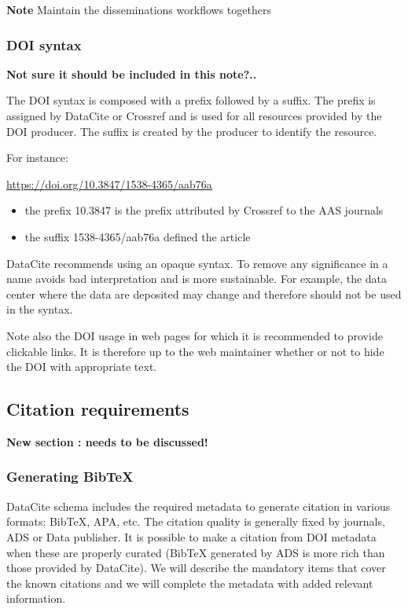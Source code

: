 \documentclass[11pt,a4paper]{ivoa}
\newcommand{\important}[1]{
	\begin{bigdescription}
		\item \color{ivoacolor}\textbf{Note} #1
	\end{bigdescription}
}
\begin{document}
\important{
Maintain the disseminations workflows togethers
}


\subsubsection{DOI syntax}
\textbf{\color{red} Not sure it should be included in this note?..}

The DOI syntax is composed with a prefix followed by a suffix.
The prefix is assigned by DataCite or Crossref and is used for all resources provided by the DOI producer. The suffix is created by the producer to identify the resource.

For instance: 

\url{https://doi.org/10.3847/1538-4365/aab76a}

\begin{itemize}
	\item the prefix 10.3847 is the prefix attributed by Crossref to the AAS journals 
	\item the suffix 1538-4365/aab76a defined the article 
\end{itemize}

DataCite recommends using an opaque syntax. To remove any significance
in a name avoids bad interpretation and is more sustainable. For example,
the data center where the data are deposited may change and therefore
should not be used in the syntax.

Note also the DOI usage in web pages for which it is recommended to provide clickable links. It is therefore up to the web maintainer whether or not to hide the DOI with appropriate text.

\subsection{Citation requirements}
\label{sec:citation}
\textbf{\color{red} New section : needs to be discussed!}


\subsubsection{Generating BibTeX}
DataCite schema includes the required metadata to generate citation in various formats: BibTeX, APA, etc. The citation quality is generally fixed by journals, ADS or Data publisher. It is possible to make a citation from DOI metadata when these are properly curated (BibTeX generated by ADS is more rich than those provided by DataCite). 
We will describe the mandatory items that cover the known citations and we will complete the metadata with added relevant information.\\
\end{document}
